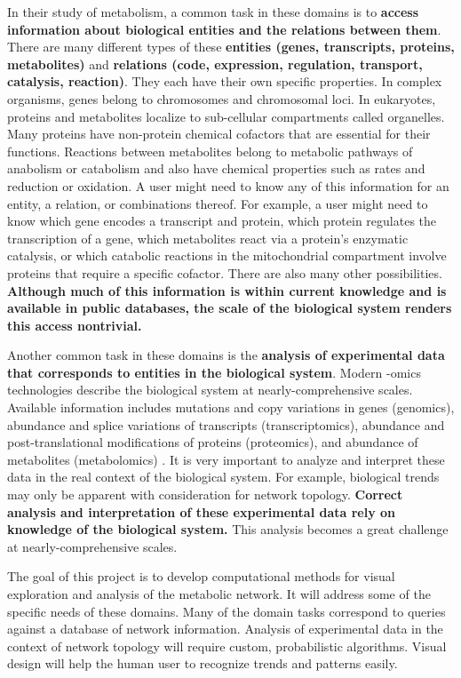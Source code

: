 In their study of metabolism, a common task in these domains is to \textbf{access information about biological entities and the relations between them}.
There are many different types of these \textbf{entities (genes, transcripts, proteins, metabolites)} and \textbf{relations (code, expression, regulation, transport, catalysis, reaction)}.
They each have their own specific properties.
In complex organisms, genes belong to chromosomes and chromosomal loci.
In eukaryotes, proteins and metabolites localize to sub-cellular compartments called organelles.
Many proteins have non-protein chemical cofactors that are essential for their functions.
Reactions between metabolites belong to metabolic pathways of anabolism or catabolism and also have chemical properties such as rates and reduction or oxidation.
A user might need to know any of this information for an entity, a relation, or combinations thereof.
For example, a user might need to know which gene encodes a transcript and protein, which protein regulates the transcription of a gene, which metabolites react via a protein's enzymatic catalysis, or which catabolic reactions in the mitochondrial compartment involve proteins that require a specific cofactor.
There are also many other possibilities.
\textbf{Although much of this information is within current knowledge and is available in public databases, the scale of the biological system renders this access nontrivial.}

Another common task in these domains is the \textbf{analysis of experimental data that corresponds to entities in the biological system}. Modern -omics technologies describe the biological system at nearly-comprehensive scales.
Available information includes mutations and copy variations in genes (genomics), abundance and splice variations of transcripts (transcriptomics), abundance and post-translational modifications of proteins (proteomics), and abundance of metabolites (metabolomics) \supercite{zhang_forward_2015}.
It is very important to analyze and interpret these data in the real context of the biological system.
For example, biological trends may only be apparent with consideration for network topology.
\textbf{Correct analysis and interpretation of these experimental data rely on knowledge of the biological system.}
This analysis becomes a great challenge at nearly-comprehensive scales.

The goal of this project is to develop computational methods for visual exploration and analysis of the metabolic network.
It will address some of the specific needs of these domains.
Many of the domain tasks correspond to queries against a database of network information.
Analysis of experimental data in the context of network topology will require custom, probabilistic algorithms.
Visual design will help the human user to recognize trends and patterns easily.

